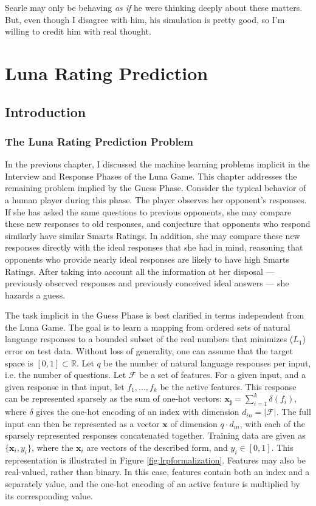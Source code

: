 \begin{savequote}[75mm]
Searle may only be behaving \textit{as if} he were thinking deeply about these matters. But, even though I disagree with him, his simulation is pretty good, so I'm willing to credit him with real thought.
\end{savequote}

\chapter{Luna Rating Prediction}

\section{Introduction}
\subsection{The Luna Rating Prediction Problem}
In the previous chapter, I discussed the machine learning problems implicit in the Interview and Response Phases of the Luna Game. This chapter addresses the remaining problem implied by the Guess Phase. Consider the typical behavior of a human player during this phase. The player observes her opponent's responses. If she has asked the same questions to previous opponents, she may compare these new responses to old responses, and conjecture that opponents who respond similarly have similar Smarts Ratings. In addition, she may compare these new responses directly with the ideal responses that she had in mind, reasoning that opponents who provide nearly ideal responses are likely to have high Smarts Ratings. After taking into account all the information at her disposal --- previously observed responses and previously conceived ideal answers --- she hazards a guess.

The task implicit in the Guess Phase is best clarified in terms independent from the Luna Game. The goal is to learn a mapping from ordered sets of natural language responses to a bounded subset of the real numbers that minimizes ($L_1$) error on test data. Without loss of generality, one can assume that the target space is $[0, 1] \subset \mathbb{R}$. Let $q$ be the number of natural language responses per input, i.e. the number of questions. Let $\mathcal{F}$ be a set of features. For a given input, and a given response in that input, let $f_1, ..., f_k$ be the active features. This response can be represented sparsely as the sum of one-hot vectors: $\mathbf{x_j} =\sum_{i=1}^k \delta(f_i)$, where $\delta$ gives the one-hot encoding of an index with dimension $d_{in} = |\mathcal{F}|$. The full input can then be represented as a vector $\mathbf{x}$ of dimension $q\cdot d_{in}$, with each of the sparsely represented responses concatenated together. Training data are given as $\{\mathbf{x}_i, y_i\}$, where the $\mathbf{x}_i$ are vectors of the described form, and $y_i \in [0, 1]$. This representation is illustrated in Figure \ref{fig:lrpformalization}. Features may also be real-valued, rather than binary. In this case, features contain both an index and a separately value, and the one-hot encoding of an active feature is multiplied by its corresponding value.

